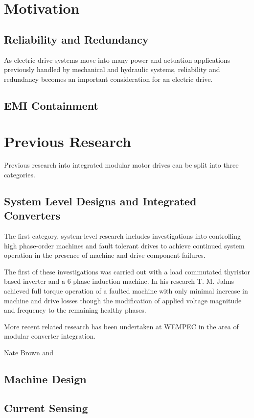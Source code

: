 \section{Motivation}



\subsection{Reliability and Redundancy}
As electric drive systems move into many power and actuation applications
previously handled by mechanical and hydraulic systems, reliability and
redundancy becomes an important consideration for an electric drive.



\subsection{EMI Containment}



\section{Previous Research}
Previous research into integrated modular motor drives can be split into three
categories.
\subsection{System Level Designs and Integrated Converters}
The first category, system-level research includes investigations into
controlling high phase-order machines and fault tolerant drives to achieve
continued system operation in the presence of machine and drive component
failures.

The first of these investigations was carried out with a load commutated
thyristor based inverter and a 6-phase induction machine.
In his research \cite{Jahns78} T. M. Jahns achieved full torque operation of a faulted
machine with only minimal increase in machine and drive losses though the
modification of applied voltage magnitude and frequency to the remaining
healthy phases.

More recent related research has been undertaken at WEMPEC in the area of
modular converter integration.

Nate Brown and 


\subsection{Machine Design}

\subsection{Current Sensing}

